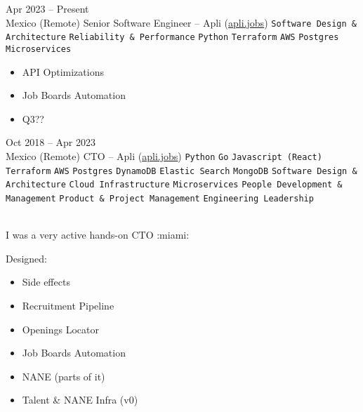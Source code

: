 \documentclass[9pt]{developercv} %
\begin{document}
\begin{entrylist}
    \entry
        {
            Apr 2023 -- Present
            \\\footnotesize{Mexico (Remote)}
        }
        {Senior Software Engineer – Apli ({\href{https://apli.jobs/}{\underline{apli.jobs}}}) }
        {
            \texttt{Software Design \& Architecture}
            \slashsep\texttt{Reliability \& Performance}
            \slashsep\texttt{Python}
            \slashsep\texttt{Terraform}
            \slashsep\texttt{AWS}
            \slashsep\texttt{Postgres}
            \slashsep\texttt{Microservices}
        }
        {
            \begin{itemize}
                \item API Optimizations
                \item Job Boards Automation
                \item Q3??
            \end{itemize}           
        }

    \entry
        {
            Oct 2018 -- Apr 2023
            \\\footnotesize{Mexico (Remote)}
        }
        {CTO – Apli ({\href{https://apli.jobs/}{\underline{apli.jobs}}}) }
        {
            \texttt{Python}
            \slashsep\texttt{Go}
            \slashsep\texttt{Javascript (React)}
            \slashsep\texttt{Terraform}
            \slashsep\texttt{AWS}
            \slashsep\texttt{Postgres}
            \slashsep\texttt{DynamoDB}
            \slashsep\texttt{Elastic Search}
            \slashsep\texttt{MongoDB}
            \slashsep\texttt{Software Design \& Architecture}
            \slashsep\texttt{Cloud Infrastructure}
            \slashsep\texttt{Microservices}
            \slashsep\texttt{People Development \& Management}
            \slashsep\texttt{Product \& Project Management}
            \slashsep\texttt{Engineering Leadership}
        }
        {\\
            I was a very active hands-on CTO :miami:

            Designed: 

            \begin{itemize}
                \item Side effects
                \item Recruitment Pipeline
                \item Openings Locator
                \item Job Boards Automation
                \item NANE (parts of it)
                \item Talent \& NANE Infra (v0)
            \end{itemize}       
        }


\end{entrylist}
\end{document}
